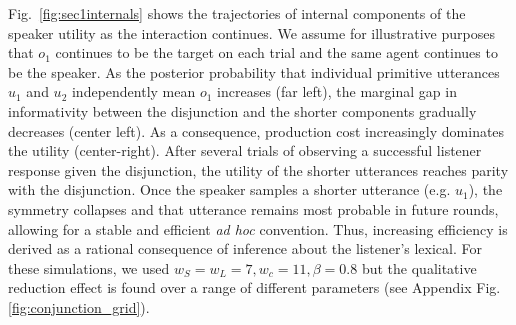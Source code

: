 Fig.~\ref{fig:sec1internals} shows the trajectories of internal components of the speaker utility as the interaction continues.
We assume for illustrative purposes that $o_1$ continues to be the target on each trial and the same agent continues to be the speaker.
As the posterior probability that individual primitive utterances $u_1$ and $u_2$ independently mean $o_1$ increases (far left), the marginal gap in informativity between the disjunction and the shorter components gradually decreases (center left).
As a consequence, production cost increasingly dominates the utility (center-right). 
After several trials of observing a successful listener response given the disjunction, the utility of the shorter utterances reaches parity with the disjunction.
Once the speaker samples a shorter utterance (e.g. $u_1$), the symmetry collapses and that utterance remains most probable in future rounds, allowing for a stable and efficient \emph{ad hoc} convention. 
Thus, increasing efficiency is derived as a rational consequence of inference about the listener's lexical.
For these simulations, we used $w_S = w_L = 7, w_c = 11, \beta=0.8$ but the qualitative reduction effect is found over a range of different parameters (see Appendix Fig. \ref{fig:conjunction_grid}). 
%
%
%




